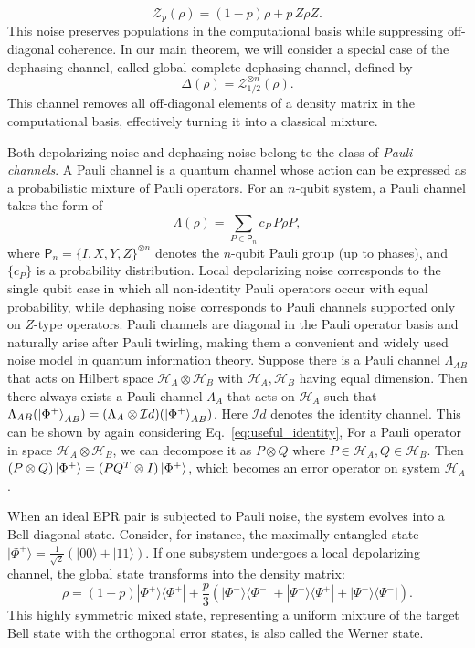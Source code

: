 \documentclass[onecolumn,prx,longbibliography,nofootinbib, superscriptaddress]{revtex4-2}
\theoremstyle{recap}
\begin{document}
\begin{equation}
\mathcal{Z}_p(\rho)
=
(1-p)\rho
+
p\, Z\rho Z.
\end{equation}
This noise preserves populations in the computational basis while suppressing off-diagonal coherence. In our main theorem, we will consider a special case of the dephasing channel, called global complete dephasing channel, defined by
\begin{equation}
    \Delta(\rho)=\mathcal{Z}_{1/2}^{\otimes n}(\rho).
\end{equation}
This channel removes all off-diagonal elements of a density matrix in the computational basis, effectively turning it into a classical mixture. 

Both depolarizing noise and dephasing noise belong to the class of \emph{Pauli channels}. A Pauli channel is a quantum channel whose action can be expressed as a probabilistic mixture of Pauli operators. For an $n$-qubit system, a Pauli channel takes the form of
\begin{equation}
\Lambda(\rho)
=
\sum_{P \in \mathsf{P}_n} c_P \, P \rho P,
\end{equation}
where $\mathsf{P}_n = \{I,X,Y,Z\}^{\otimes n}$ denotes the $n$-qubit Pauli group (up to phases), and $\{c_P\}$ is a probability distribution. Local depolarizing noise corresponds to the single qubit case in which all non-identity Pauli operators occur with equal probability, while dephasing noise corresponds to Pauli channels supported only on $Z$-type operators. Pauli channels are diagonal in the Pauli operator basis and naturally arise after Pauli twirling, making them a convenient and widely used noise model in quantum information theory. Suppose there is a Pauli channel $\Lambda_{AB}$ that acts on Hilbert space $\mathcal{H}_A\otimes\mathcal{H}_B$ with $\mathcal{H}_A, \mathcal{H}_B$ having equal dimension. Then there always exists a Pauli channel $\Lambda_A$ that acts on $\mathcal{H}_A$ such that $\Lambda_{AB}(\ket{\Phi^+}_{AB})=(\Lambda_{A}\otimes \mathcal{I}d)(\ket{\Phi^+}_{AB})$. Here $\mathcal{I}d$ denotes the identity channel. This can be shown by again considering Eq.~\eqref{eq:useful_identity}, For a Pauli operator in space $\mathcal{H}_A\otimes\mathcal{H}_B$, we can decompose it as $P\otimes Q$ where $P\in\mathcal{H}_A,Q\in\mathcal{H}_B$. Then $(P\otimes Q)\ket{\Phi^+}=(PQ^T\otimes I)\ket{\Phi^+}$, which becomes an error operator on system $\mathcal{H}_A$.

When an ideal EPR pair is subjected to Pauli noise, the system evolves into a Bell-diagonal state. Consider, for instance, the maximally entangled state $|\Phi^+\rangle = \frac{1}{\sqrt{2}}(|00\rangle+|11\rangle)$. If one subsystem undergoes a local depolarizing channel, the global state transforms into the density matrix:
\begin{equation}
    \rho = (1-p)|\Phi^+\rangle\langle\Phi^+| + \frac{p}{3}\left(|\Phi^-\rangle\langle\Phi^-| + |\Psi^+\rangle\langle\Psi^+| + |\Psi^-\rangle\langle\Psi^-|\right).
\end{equation}
This highly symmetric mixed state, representing a uniform mixture of the target Bell state with the orthogonal error states, is also called the Werner state.
\end{document}
